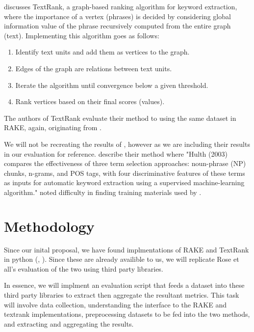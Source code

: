 \documentclass[11pt,a4paper]{article}
\begin{document}
\citet{4} discusses TextRank, a graph-based ranking algorithm for keyword extraction, where the importance of a vertex (phrases) is decided by considering global information value of the phrase recursively computed from the entire graph (text). Implementing this algorithm goes as follows:

\begin{enumerate}
\item Identify text units and add them as vertices to the graph.
\item Edges of the graph are relations between text units.
\item Iterate the algorithm until convergence below a given threshold. 
\item Rank vertices based on their final scores (values).
\end{enumerate}   

The authors of TextRank evaluate their method to \citet{hulth-2003-improved} using the same dataset in RAKE, again, originating from \citet{hulth-2003-improved}.

We will not be recreating the results of \citet{hulth-2003-improved}, however as we are including their results in our evaluation for reference. \citet{1} describe their method where "Hulth (2003) compares the effectiveness of three term selection approaches: noun-phrase (NP) chunks, n-grams, and POS tags, with four discriminative features of these terms as inputs for automatic keyword extraction using a supervised machine-learning algorithm." \citet{1} noted difficulty in finding training materials used by \citet{hulth-2003-improved}.    

\section{Methodology}

Since our inital proposal, we have found implmentations of RAKE and TextRank in python (\citet{2}, \citet{3}). Since these are already availible to us, we will replicate \citet{1} Rose et all's evaluation of the two using third party libraries. 

In essence, we will implment an evaluation script that feeds a dataset into these third party libraries to extract then aggregate the resultant metrics. This task will involve data collection, understanding the interface to the RAKE and textrank implementations, preprocessing datasets to be fed into the two methods, and extracting and aggregating the results.
\end{document}
